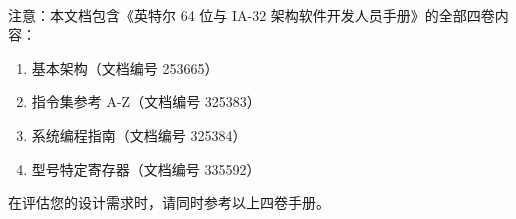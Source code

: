 \documentclass{article}
\begin{document}
注意：本文档包含《英特尔\textsuperscript{\textregistered} 64 位与 IA-32 架构软件开发人员手册》的全部四卷内容：
\begin{enumerate}
    \item 基本架构（文档编号 253665）
    \item 指令集参考 A-Z（文档编号 325383）
    \item 系统编程指南（文档编号 325384）
    \item 型号特定寄存器（文档编号 335592）
\end{enumerate}

在评估您的设计需求时，请同时参考以上四卷手册。
\end{document}
